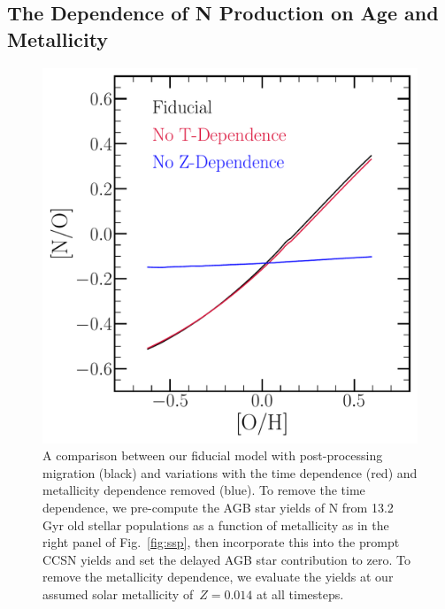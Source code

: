 \documentclass[ms.tex]{subfiles}
\begin{document}
\subsection{The Dependence of N Production on Age and Metallicity}
\label{sec:results:t_z_dep_comp}

\begin{figure}
\centering
\includegraphics[scale = 0.45]{t_z_dep_comp.pdf}
\caption{
A comparison between our fiducial model with post-processing migration (black)
and variations with the time dependence (red) and metallicity dependence 
removed (blue).
To remove the time dependence, we pre-compute the AGB star yields of N from
13.2 Gyr old stellar populations as a function of metallicity as in the right
panel of Fig.~\ref{fig:ssp}, then incorporate this into the prompt CCSN yields
and set the delayed AGB star contribution to zero.
To remove the metallicity dependence, we evaluate the yields at our assumed
solar metallicity of~$Z = 0.014$ at all timesteps.
}
\label{fig:t_z_dep_comp}
\end{figure}
\end{document}
